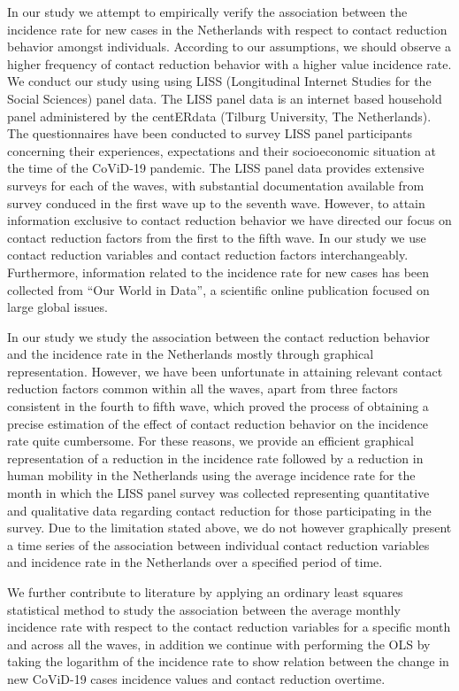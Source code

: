 \documentclass[11pt, a4paper, leqno]{article}
\begin{document}
In our study we attempt to empirically verify the association between the incidence rate for new cases in the Netherlands with respect to contact reduction behavior amongst individuals. According to our assumptions, we should observe a higher frequency of contact reduction behavior with a higher value incidence rate. We conduct our study using using LISS (Longitudinal Internet Studies for the Social Sciences) panel data. The LISS panel data is an internet based household panel administered by the centERdata (Tilburg University, The Netherlands). The questionnaires have been conducted to survey LISS panel participants concerning their experiences, expectations and their socioeconomic situation at the time of the CoViD-19 pandemic. The LISS panel data provides extensive surveys for each of the waves, with substantial documentation available from survey conduced in the first wave up to the seventh wave. However, to attain information exclusive to contact reduction behavior we have directed our focus on contact reduction factors from the first to the fifth wave. In our study we use contact reduction variables and contact reduction factors interchangeably. Furthermore, information related to the incidence rate for new cases has been collected from ``Our World in Data'', a scientific online publication focused on large global issues. 
 
In our study we study the association between the contact reduction behavior and the incidence rate in the Netherlands mostly through graphical representation. However, we have been unfortunate in attaining relevant contact reduction factors common within all the waves, apart from three factors consistent in the fourth to fifth wave, which proved the process of obtaining a precise estimation of the effect of contact reduction behavior on the incidence rate quite cumbersome. For these reasons, we provide an efficient graphical representation of a reduction in the incidence rate followed by a reduction in human mobility in the Netherlands using the average incidence rate for the month in which the LISS panel survey was collected representing quantitative and qualitative data regarding contact reduction for those participating in the survey. Due to the limitation stated above, we do not however graphically present a time series of the association between individual contact reduction variables and incidence rate in the Netherlands over a specified period of time. 

We further contribute to literature by applying an ordinary least squares statistical method to study the association between the average monthly incidence rate with respect to the contact reduction variables for a specific month and across all the waves, in addition we continue with performing the OLS by taking the logarithm of the incidence rate to  show relation between the change in new CoViD-19 cases incidence values and contact reduction  overtime. 
\end{document}

